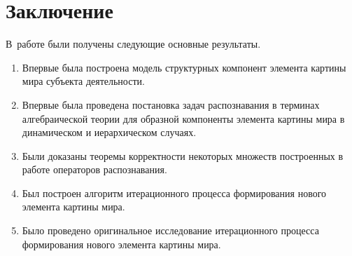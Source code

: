 \chapter*{Заключение}						%

В~работе были получены следующие основные результаты.

\begin{enumerate}
	\renewcommand\labelenumi{\theenumi.}
	\item Впервые была построена модель структурных компонент элемента картины мира субъекта деятельности.
	\item Впервые была проведена постановка задач распознавания в терминах алгебраической теории для образной компоненты элемента картины мира в динамическом и иерархическом случаях.
	\item Были доказаны теоремы корректности некоторых множеств построенных в работе операторов распознавания.
	\item Был построен алгоритм итерационного процесса формирования нового элемента картины мира.
	\item Было проведено оригинальное исследование итерационного процесса формирования нового элемента картины мира.
\end{enumerate}

\clearpage